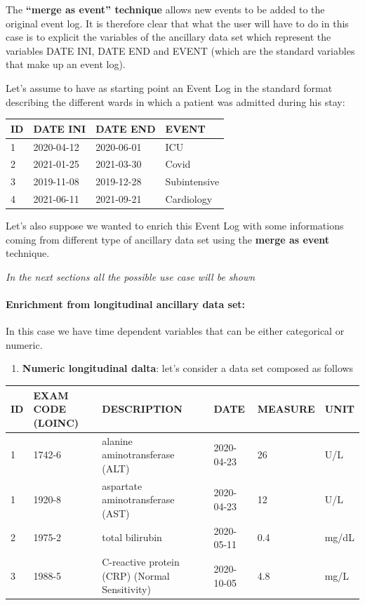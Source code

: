 \documentclass[
]{book}
\providecommand{\tightlist}{%
  \setlength{\itemsep}{0pt}\setlength{\parskip}{0pt}}
\begin{document}
The \textbf{``merge as event'' technique} allows new events to be added to the original event log. It is therefore clear that what the user will have to do in this case is to explicit the variables of the ancillary data set which represent the variables DATE INI, DATE END and EVENT (which are the standard variables that make up an event log).

Let's assume to have as starting point an Event Log in the standard format describing the different wards in which a patient was admitted during his stay:

\begin{longtable}[]{@{}llll@{}}
\toprule
ID & DATE INI & DATE END & EVENT \\
\midrule
\endhead
1 & 2020-04-12 & 2020-06-01 & ICU \\
2 & 2021-01-25 & 2021-03-30 & Covid \\
3 & 2019-11-08 & 2019-12-28 & Subintensive \\
4 & 2021-06-11 & 2021-09-21 & Cardiology \\
\bottomrule
\end{longtable}

Let's also suppose we wanted to enrich this Event Log with some informations coming from different type of ancillary data set using the \textbf{merge as event} technique.

\emph{In the next sections all the possible use case will be shown}

\hypertarget{enrichment-from-longitudinal-ancillary-data-set}{%
\paragraph{Enrichment from longitudinal ancillary data set:}\label{enrichment-from-longitudinal-ancillary-data-set}}

In this case we have time dependent variables that can be either categorical or numeric.

\begin{enumerate}
\def\labelenumi{\arabic{enumi}.}
\tightlist
\item
  \textbf{Numeric longitudinal dalta}: let's consider a data set composed as follows
\end{enumerate}

\begin{longtable}[]{@{}llllll@{}}
\toprule
ID & EXAM CODE (LOINC) & DESCRIPTION & DATE & MEASURE & UNIT \\
\midrule
\endhead
1 & 1742-6 & alanine aminotransferase (ALT) & 2020-04-23 & 26 & U/L \\
1 & 1920-8 & aspartate aminotransferase (AST) & 2020-04-23 & 12 & U/L \\
2 & 1975-2 & total bilirubin & 2020-05-11 & 0.4 & mg/dL \\
3 & 1988-5 & C-reactive protein (CRP) (Normal Sensitivity) & 2020-10-05 & 4.8 & mg/L \\
\bottomrule
\end{longtable}
\end{document}
